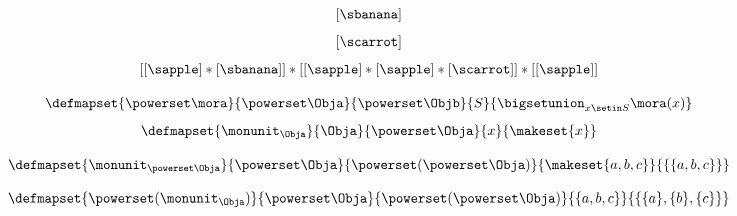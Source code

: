 {\begin{forslides}
\begin{equation}
            [ \sapple ]
        \end{equation}
        \begin{equation}
            \label{eq:fruit-sum-17}
            [ \sbanana ]
        \end{equation}
        \begin{equation}
            \label{eq:fruit-sum-18}
            [ \scarrot ]
        \end{equation}
        \begin{equation}
            \label{eq:fruit-sum-20}
            [ [ \sapple ]   * [ \sbanana] ] *  [[ \sapple ]   *  [ \sapple ] *  [\scarrot ] ]   *  [[ \sapple ] ]
        \end{equation}

        \begin{equation}
            \label{eq:monad-power-functor}
            \defmapset{
                \powerset \mora
            }{
                \powerset \Obja
            }{
                \powerset \Objb
            }{
                S
            }{
                \bigsetunion_{x\setin S} \mora(x)
            }
        \end{equation}
        \begin{equation}
            \label{eq:monad-power-monunit}
            \defmapset{
                \monunit_\Obja
            }{
                \Obja
            }{
                \powerset\Obja
            }{
                x
            }{
                \makeset{ x }
            }
        \end{equation}

        \begin{equation}
            \label{eq:monad-power-monunit-power}
            \defmapset{
                \monunit_{\powerset \Obja}
            }{
                \powerset \Obja
            }{
                \powerset (\powerset\Obja)
            }{
                \makeset{a, b, c}
            }{
                \{ \{a, b, c \} \}
            }
        \end{equation}

        \begin{equation}
            \label{eq:monad-power-power-monunit}
            \defmapset{
                \powerset(\monunit_\Obja)
            }{
                \powerset \Obja
            }{
                \powerset (\powerset\Obja)
            }{
                \{a, b, c\}
            }{
                \{ \{a\}, \{ b\}, \{c\} \}
            }
        \end{equation}


\end{forslides}}

